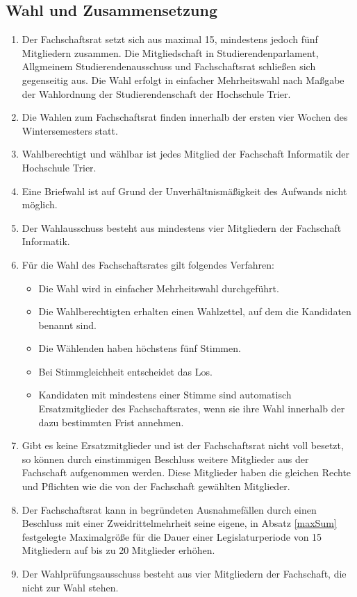 \subsection{Wahl und Zusammensetzung}
\label{sec:zusammensetzung}
\begin{enumerate}
	\item \label{maxSum} Der Fachschaftsrat setzt sich aus maximal 15, mindestens jedoch fünf Mitgliedern zusammen. Die Mitgliedschaft in Studierendenparlament, Allgmeinem Studierendenausschuss und Fachschaftsrat schließen sich gegenseitig aus. Die Wahl erfolgt in einfacher Mehrheitswahl nach Maßgabe der Wahlordnung der Studierendenschaft der Hochschule Trier.
	\item Die Wahlen zum Fachschaftsrat finden innerhalb der ersten vier Wochen des Wintersemesters statt.
	\item Wahlberechtigt und wählbar ist jedes Mitglied der Fachschaft Informatik der Hochschule Trier.
	\item Eine Briefwahl ist auf Grund der Unverhältnismäßigkeit des Aufwands nicht möglich.
	\item Der Wahlausschuss besteht aus mindestens vier Mitgliedern der Fachschaft Informatik.
	\item Für die Wahl des Fachschaftsrates gilt folgendes Verfahren:
	\begin{itemize}
		\item Die Wahl wird in einfacher Mehrheitswahl durchgeführt.
		\item Die Wahlberechtigten erhalten einen Wahlzettel, auf dem die Kandidaten benannt sind.
		\item Die Wählenden haben höchstens fünf Stimmen.
		\item Bei Stimmgleichheit entscheidet das Los.
		\item Kandidaten mit mindestens einer Stimme sind automatisch Ersatzmitglieder des Fachschaftsrates, wenn sie ihre Wahl innerhalb der dazu bestimmten Frist annehmen.
	\end{itemize}
	\item \label{ersatz} Gibt es keine Ersatzmitglieder und ist der Fachschaftsrat nicht voll besetzt, so können durch einstimmigen Beschluss weitere Mitglieder aus der Fachschaft aufgenommen werden. Diese Mitglieder haben die gleichen Rechte und Pflichten wie die von der Fachschaft gewählten Mitglieder.
	\item Der Fachschaftsrat kann in begründeten Ausnahmefällen durch einen Beschluss mit einer Zweidrittelmehrheit seine eigene, in Absatz \ref{maxSum} festgelegte Maximalgröße für die Dauer einer Legislaturperiode von 15 Mitgliedern auf bis zu 20 Mitglieder erhöhen.
	\item Der Wahlprüfungsausschuss besteht aus vier Mitgliedern der Fachschaft, die nicht zur Wahl stehen.
\end{enumerate}

